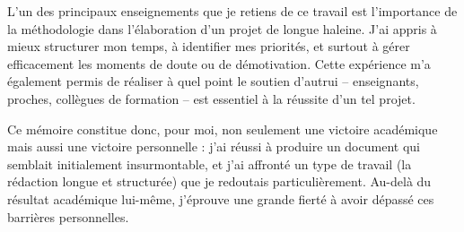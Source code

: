 \documentclass[11pt,a4paper]{report}
\begin{document}
L’un des principaux enseignements que je retiens de ce travail est l’importance de la méthodologie dans l’élaboration d’un projet de longue haleine. J’ai appris à mieux structurer mon temps, à identifier mes priorités, et surtout à gérer efficacement les moments de doute ou de démotivation. Cette expérience m’a également permis de réaliser à quel point le soutien d’autrui – enseignants, proches, collègues de formation – est essentiel à la réussite d’un tel projet.

Ce mémoire constitue donc, pour moi, non seulement une victoire académique mais aussi une victoire personnelle : j’ai réussi à produire un document qui semblait initialement insurmontable, et j’ai affronté un type de travail (la rédaction longue et structurée) que je redoutais particulièrement. Au-delà du résultat académique lui-même, j’éprouve une grande fierté à avoir dépassé ces barrières personnelles.


\end{document}

